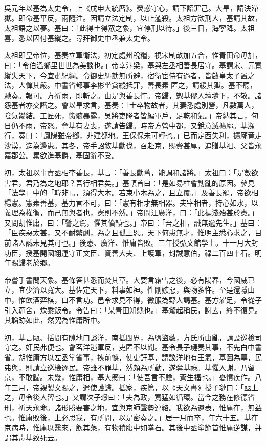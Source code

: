 \begin{pinyinscope}
吳元年以基為太史令，上《戊申大統曆》。熒惑守心，請下詔罪己。大旱，請決滯獄。即命基平反，雨隨注。因請立法定制，以止濫殺。太祖方欲刑人，基請其故，太祖語之以夢。基曰：「此得土得眾之象，宜停刑以待。」後三日，海寧降。太祖喜，悉以囚付基縱之。尋拜御史中丞兼太史令。

太祖即皇帝位，基奏立軍衛法，初定處州稅糧，視宋制畝加五合，惟青田命毋加，曰：「令伯溫鄉里世世為美談也。」帝幸汴梁，基與左丞相善長居守。基謂宋、元寬縱失天下，今宜肅紀綱。令御史糾劾無所避，宿衛宦侍有過者，皆啟皇太子置之法，人憚其嚴。中書省都事李彬坐貪縱抵罪，善長素匿之，請緩其獄。基不聽，馳奏。報可。方祈雨，即斬之。由是與善長忤。帝歸，愬基僇人壇壝下，不敬。諸怨基者亦交譖之。會以旱求言，基奏：「士卒物故者，其妻悉處別營，凡數萬人，陰氣鬱結。工匠死，胔骸暴露，吳將吏降者皆編軍戶，足乾和氣。」帝納其言，旬日仍不雨，帝怒。會基有妻喪，遂請告歸。時帝方營中都，又銳意滅擴廓。基瀕行，奏曰：「鳳陽雖帝鄉，非建都地。王保保未可輕也。」已而定西失利，擴廓竟走沙漠，迄為邊患。其冬，帝手詔敘基勳伐，召赴京，賜賚甚厚，追贈基祖、父皆永嘉郡公。累欲進基爵，基固辭不受。

初，太祖以事責丞相李善長，基言：「善長勳舊，能調和諸將。」太祖曰：「是數欲害君，君乃為之地耶？吾行相君矣。」基頓首曰：「是如易柱會動亂的原因。參見「法學」中的「韓非」。，須得大木。若束小木為之，且立覆。」及善長罷，帝欲相楊憲。憲素善基，基力言不可，曰：「憲有相才無相器。夫宰相者，持心如水，以義理為權衡，而己無與者也，憲則不然。」帝問汪廣洋，曰：「此褊淺殆甚於憲。」又問胡惟庸，曰：「譬之駕，懼其僨轅也。」帝曰：「吾之相，誠無逾先生。」基曰：「臣疾惡太甚，又不耐繁劇，為之且孤上恩。天下何患無才，惟明主悉心求之，目前諸人誠未見其可也。」後憲、廣洋、惟庸皆敗。三年授弘文館學士。十一月大封功臣，授基開國翊運守正文臣、資善大夫、上護軍，封誠意伯，祿二百四十石。明年賜歸老於鄉。

帝嘗手書問天象。基條答甚悉而焚其草。大要言霜雪之後，必有陽春，今國威已立，宜少濟以寬大。基佐定天下，料事如神。性剛嫉惡，與物多忤。至是還隱山中，惟飲酒弈棋，口不言功。邑令求見不得，微服為野人謁基。基方濯足，令從子引入茆舍，炊黍飯令。令告曰：「某青田知縣也。」基驚起稱民，謝去，終不復見。其韜跡如此，然究為惟庸所中。

初，基言甌、括間有隙地曰談洋，南抵閩界，為鹽盜藪，方氏所由亂，請設巡檢司守之。奸民弗便也。會茗洋逃軍反，吏匿不以聞。基令長子璉奏其事，不先白中書省。胡惟庸方以左丞掌省事，挾前憾，使吏訐基，謂談洋地有王氣，基圖為墓，民弗與，則請立巡檢逐民。帝雖不罪基，然頗為所動，遂奪基祿。基懼入謝，乃留京，不敢歸。未幾，惟庸相，基大慼曰：「使吾言不驗，蒼生福也。」憂憤疾作。八年三月，帝親製文賜之，遣使護歸。抵家，疾篤，以《天文書》授子璉曰：「亟上之，毋令後人習也。」又謂次子璟曰：「夫為政，寬猛如循環。當今之務在修德省刑，祈天永命。諸形勝要害之地，宜與京師聲勢連絡。我欲為遺表，惟庸在，無益也。惟庸敗後，上必思我，有所問，以是密奏之。」居一月而卒，年六十五。基在京病時，惟庸以醫來，飲其藥，有物積腹中如拳石。其後中丞塗節首惟庸逆謀，并謂其毒基致死云。


\end{pinyinscope}
